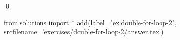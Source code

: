 
    \begin{ex}
  \label{ex:double-for-loop-2}
  
  \qed
\end{ex}
\begin{python0}
from solutions import *
add(label="ex:double-for-loop-2",
    srcfilename='exercises/double-for-loop-2/answer.tex') 
\end{python0}                              
